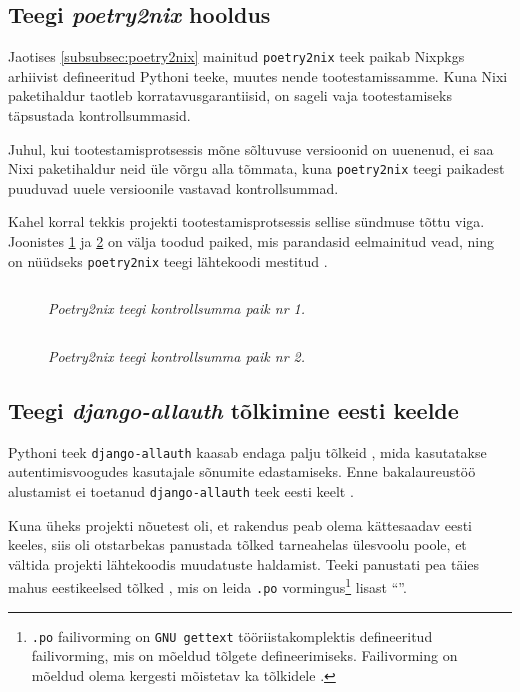 \subsection{Teegi \emph{poetry2nix} hooldus}

Jaotises \ref{subsubsec:poetry2nix} mainitud \texttt{poetry2nix} teek paikab Nixpkgs arhiivist defineeritud Pythoni teeke, muutes nende tootestamissamme. Kuna Nixi paketihaldur taotleb korratavusgarantiisid, on sageli vaja tootestamiseks täpsustada kontrollsummasid.

Juhul, kui tootestamisprotsessis mõne sõltuvuse versioonid on uuenenud, ei saa Nixi paketihaldur neid üle võrgu alla tõmmata, kuna \texttt{poetry2nix} teegi paikadest puuduvad uuele versioonile vastavad kontrollsummad.

Kahel korral tekkis projekti tootestamisprotsessis sellise sündmuse tõttu viga. Joonistes \ref{fig:poetry2nix-patch1} ja \ref{fig:poetry2nix-patch2} on välja toodud paiked, mis parandasid eelmainitud vead, ning on nüüdseks \texttt{poetry2nix} teegi lähtekoodi mestitud \cite{poetry2nix-pr-1, poetry2nix-pr-2}.

\begin{figure}
\inputminted[breaklines]{diff}{chapters/data/poetry2nix-patch1.diff}
\caption{\emph{Poetry2nix teegi kontrollsumma paik nr 1.}}\label{fig:poetry2nix-patch1}
\end{figure}

\begin{figure}
\inputminted[breaklines]{diff}{chapters/data/poetry2nix-patch2.diff}
\caption{\emph{Poetry2nix teegi kontrollsumma paik nr 2.}}\label{fig:poetry2nix-patch2}
\end{figure}

\subsection{Teegi \textit{django-allauth} tõlkimine eesti keelde}

Pythoni teek \texttt{django-allauth} kaasab endaga palju tõlkeid \cite{django-allauth-i18n}, mida kasutatakse autentimisvoogudes kasutajale sõnumite edastamiseks. Enne bakalaureustöö alustamist ei toetanud \texttt{django-allauth} teek eesti keelt \cite{django-allauth-pre-et-i18n}.

Kuna üheks projekti nõuetest oli, et rakendus peab olema kättesaadav eesti keeles, siis oli otstarbekas panustada tõlked tarneahelas ülesvoolu poole, et vältida projekti lähtekoodis muudatuste haldamist. Teeki panustati pea täies mahus eestikeelsed tõlked \cite{django-allauth-et-i18n-pr}, mis on leida \texttt{.po} vormingus\footnote{\texttt{.po} failivorming on \texttt{GNU gettext} tööriistakomplektis defineeritud failivorming, mis on mõeldud tõlgete defineerimiseks. Failivorming on mõeldud olema kergesti mõistetav ka tõlkidele \cite{gnu-gettext-po}.} lisast ``''.

